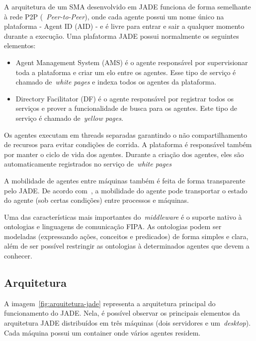 A arquitetura de um SMA desenvolvido em JADE funciona de forma semelhante à rede P2P (~\emph{Peer-to-Peer}), onde cada agente possui um nome único na plataforma - Agent ID (AID) - e é livre para entrar e sair a qualquer momento durante a execução. Uma plafatorma JADE possui normalmente os seguintes elementos:

\begin{itemize}
	\item Agent Management System (AMS) é o agente responsável por supervisionar toda a plataforma e criar um elo entre os agentes. Esse tipo de serviço é chamado de~\emph{white pages} e indexa todos os agentes da plataforma.
	\item Directory Facilitator (DF) é o agente responsável por registrar todos os serviços e prover a funcionalidade de busca para os agentes. Este tipo de serviço é chamado de~\emph{yellow pages}.
\end{itemize}

Os agentes executam em threads separadas garantindo o não compartilhamento de recursos para evitar condições de corrida. A plataforma é responsável também por manter o ciclo de vida dos agentes. Durante a criação dos agentes, eles são automaticamente registrados no serviço de~\emph{white pages}

A mobilidade de agentes entre máquinas também é feita de forma transparente pelo JADE. De acordo com~\cite{bellifemine07}, a mobilidade do agente pode transportar o estado do agente (sob certas condições) entre processos e máquinas.

Uma das características mais importantes do~\emph{middleware} é o suporte nativo à ontologias e linguagens de comunicação FIPA. As ontologias podem ser modeladas (expressando ações, conceitos e predicados) de forma simples e clara, além de ser possível restringir as ontologias à determinados agentes que devem a conhecer.

\subsection{Arquitetura}

A imagem~\ref{fig:arquitetura-jade} representa a arquitetura principal do funcionamento do JADE. Nela, é possível observar os principais elementos da arquitetura JADE distribuídos em três máquinas (dois servidores e um~\emph{desktop}). Cada máquina possui um container onde vários agentes residem.

